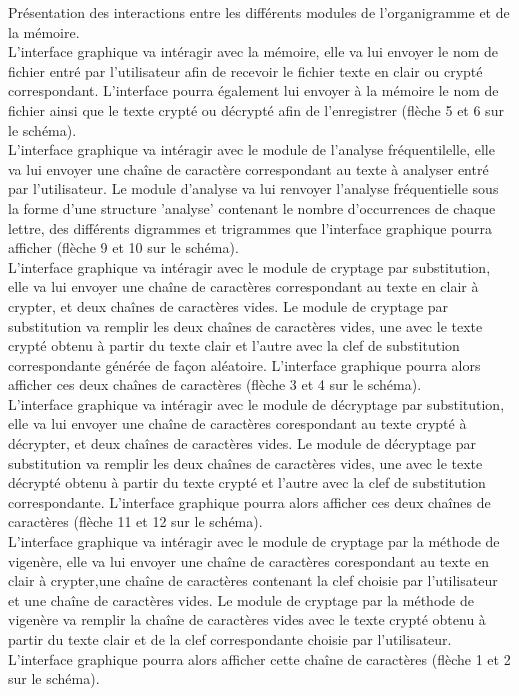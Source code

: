 \documentclass[a4]{article}
\begin{document}
	
Présentation des interactions entre les différents modules de l'organigramme et de la mémoire. \\

	L'interface graphique va intéragir avec la mémoire, elle va lui envoyer le nom de fichier entré par l'utilisateur 
	afin de recevoir le fichier texte en clair ou crypté correspondant. L'interface pourra également lui envoyer à la 
	mémoire le nom de fichier ainsi que le texte crypté ou décrypté afin de l'enregistrer (flèche 5 et 6 sur le schéma). \\

	L'interface graphique va intéragir avec le module de l'analyse fréquentilelle, elle va lui envoyer une chaîne de 
	caractère correspondant au texte à analyser entré par l'utilisateur. Le module d'analyse va lui renvoyer l'analyse 
	fréquentielle sous la forme d'une structure 'analyse' contenant le nombre d'occurrences de chaque lettre, des différents
	digrammes et trigrammes que l'interface graphique pourra afficher (flèche 9 et 10 sur le schéma). \\

	L'interface graphique va intéragir avec le module de cryptage par substitution, elle va lui envoyer une 
	chaîne de caractères correspondant au texte en clair à crypter, et deux chaînes de caractères vides. Le module
	de cryptage par substitution va remplir les deux chaînes de caractères vides, une avec le texte crypté obtenu
	à partir du texte clair et l'autre avec la clef de substitution correspondante générée de façon aléatoire.
	L'interface graphique pourra alors afficher ces deux chaînes de caractères (flèche 3 et 4 sur le schéma). \\

	L'interface graphique va intéragir avec le module de décryptage par substitution, elle va lui envoyer une 
	chaîne de caractères corespondant au texte crypté à décrypter, et deux chaînes de caractères vides. Le module 
	de décryptage par substitution va remplir les deux chaînes de caractères vides, une avec le texte décrypté obtenu
	à partir du texte crypté et l'autre avec la clef de substitution correspondante. L'interface graphique pourra 
	alors afficher ces deux chaînes de caractères (flèche 11 et 12 sur le schéma). \\

	L'interface graphique va intéragir avec le module de cryptage par la méthode de vigenère, elle va lui envoyer une
	chaîne de caractères corespondant au texte en clair à crypter,une chaîne de caractères contenant la clef choisie par 
	l'utilisateur et une chaîne de caractères vides. Le module de cryptage par la méthode de vigenère va remplir la chaîne
	de caractères vides avec le texte crypté obtenu à partir du texte clair et de la clef correspondante choisie par
	l'utilisateur. L'interface graphique pourra alors afficher cette chaîne de caractères (flèche 1 et 2 sur le schéma). \\
\end{document}

